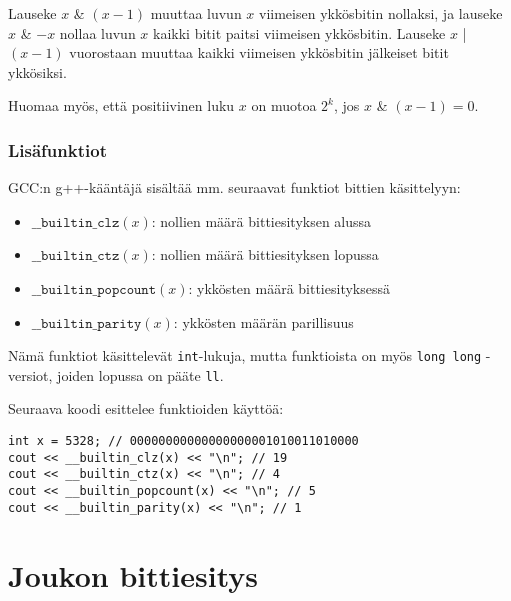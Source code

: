 Lauseke $x$ \& $(x-1)$ muuttaa luvun $x$ viimeisen
ykkösbitin nollaksi, ja lauseke $x$ \& $-x$ nollaa
luvun $x$ kaikki bitit paitsi viimeisen ykkösbitin.
Lauseke $x$ | $(x-1)$ vuorostaan muuttaa kaikki
viimeisen ykkösbitin jälkeiset bitit ykkösiksi.

Huomaa myös, että positiivinen luku $x$ on muotoa $2^k$,
jos $x$ \& $(x-1) = 0$.
% 
% 

\subsubsection*{Lisäfunktiot}

GCC:n g++-kääntäjä sisältää mm. seuraavat funktiot
bittien käsittelyyn:

\begin{itemize}
\item
$\texttt{\_\_builtin\_clz}(x)$:
nollien määrä bittiesityksen alussa
\item
$\texttt{\_\_builtin\_ctz}(x)$:
nollien määrä bittiesityksen lopussa
\item
$\texttt{\_\_builtin\_popcount}(x)$:
ykkösten määrä bittiesityksessä
\item
$\texttt{\_\_builtin\_parity}(x)$:
ykkösten määrän parillisuus
\end{itemize}

\begin{samepage}
\noindent
Nämä funktiot käsittelevät \texttt{int}-lukuja,
mutta funktioista on myös \texttt{long long} -versiot,
joiden lopussa on pääte \texttt{ll}.

Seuraava koodi esittelee funktioiden käyttöä:

\begin{lstlisting}
int x = 5328; // 00000000000000000001010011010000
cout << __builtin_clz(x) << "\n"; // 19
cout << __builtin_ctz(x) << "\n"; // 4
cout << __builtin_popcount(x) << "\n"; // 5
cout << __builtin_parity(x) << "\n"; // 1
\end{lstlisting}
\end{samepage}

\section{Joukon bittiesitys}

